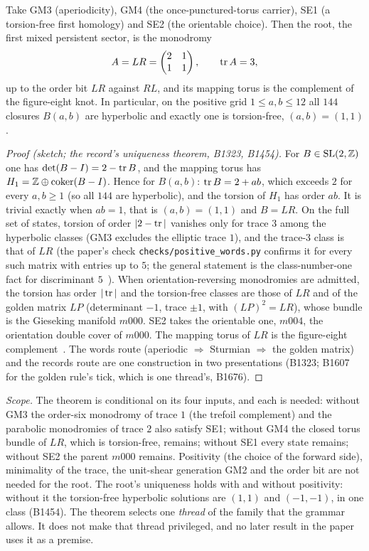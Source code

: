 \begin{theorem}\label{thm:seed}
Take GM3 (aperiodicity), GM4 (the once-punctured-torus carrier), SE1 (a torsion-free first homology) and SE2 (the
orientable choice). Then the root, the first mixed persistent sector, is the monodromy
\[
  A=LR=\begin{pmatrix}2&1\\1&1\end{pmatrix},\qquad \operatorname{tr} A=3,
\]
up to the order bit $LR$ against $RL$, and its mapping torus is the complement of the figure-eight knot. In
particular, on the positive grid $1\le a,b\le12$ all $144$ closures $B(a,b)$ are hyperbolic and exactly one is
torsion-free, $(a,b)=(1,1)$.
\end{theorem}
\begin{proof}[Proof (sketch; the record's uniqueness theorem, B1323, B1454)]
For $B\in\mathrm{SL}(2,\mathbb{Z})$ one has $\det(B-I)=2-\operatorname{tr} B$, and the mapping torus has $H_1=\mathbb{Z}\oplus\mathrm{coker}(B-I)$. Hence for
$B(a,b)$: $\operatorname{tr} B=2+ab$, which exceeds $2$ for every $a,b\ge1$ (so all $144$ are hyperbolic), and the torsion of $H_1$
has order $ab$. It is trivial exactly when $ab=1$, that is $(a,b)=(1,1)$ and $B=LR$. On the full set of states, torsion
of order $|2-\operatorname{tr}|$ vanishes only for trace $3$ among the hyperbolic classes (GM3 excludes the elliptic trace $1$), and
the trace-$3$ class is that of $LR$ (the paper's check \texttt{checks/positive\_words.py} confirms it for every such matrix with entries up to $5$; the general
statement is the class-number-one fact for discriminant $5$~\cite{Buell1989}). When orientation-reversing monodromies are
admitted, the torsion has order $|\operatorname{tr}|$ and the torsion-free classes are those of $LR$ and of the golden matrix $LP$
(determinant $-1$, trace $\pm1$, with $(LP)^2=LR$), whose bundle is the Gieseking manifold $m000$. SE2 takes the
orientable one, $m004$, the orientation double cover of $m000$. The mapping torus of $LR$ is the figure-eight complement~\cite{Riley1975,Thurston1979}.
The words route (aperiodic $\Rightarrow$ Sturmian $\Rightarrow$ the golden matrix) and the records route are one
construction in two presentations (B1323; B1607 for the golden rule's tick, which is one thread's, B1676).
\end{proof}

\noindent\emph{Scope.} The theorem is conditional on its four inputs, and each is needed: without GM3 the order-six
monodromy of trace $1$ (the trefoil complement) and the parabolic monodromies of trace $2$ also satisfy SE1; without GM4
the closed torus bundle of $LR$, which is torsion-free, remains; without SE1 every state remains; without SE2 the parent $m000$ remains. Positivity (the choice of the forward side), minimality of the trace, the unit-shear generation GM2 and
the order bit are not needed for the root. The root's uniqueness holds with and without positivity: without it the
torsion-free hyperbolic solutions are $(1,1)$ and $(-1,-1)$, in one class (B1454). The theorem selects one
\emph{thread} of the family that the grammar allows. It does not make that thread privileged, and no later result in
the paper uses it as a premise.

